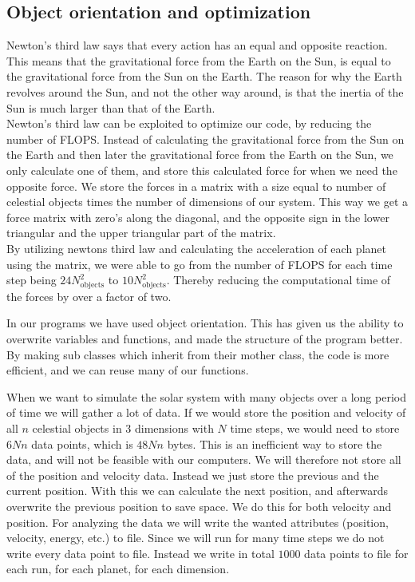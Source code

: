 \documentclass[%
 reprint,
nofootinbib,
aps,
]{revtex4-1}
\begin{document}
\subsection{Object orientation and optimization}
Newton's third law says that every action has an equal and opposite reaction. This means that the gravitational force from the Earth on the Sun, is equal to the gravitational force from the Sun on the Earth. The reason for why the Earth revolves around the Sun, and not the other way around, is that the inertia of the Sun is much larger than that of the Earth.\\
Newton's third law can be exploited to optimize our code, by reducing the number of FLOPS. Instead of calculating the gravitational force from the Sun on the Earth and then later the gravitational force from the Earth on the Sun, we only calculate one of them, and store this calculated force for when we need the opposite force.
We store the forces in a matrix with a size equal to number of celestial objects times the number of dimensions of our system. This way we get a force matrix with zero's along the diagonal, and the opposite sign in the lower triangular and the upper triangular part of the matrix.\\
By utilizing newtons third law and calculating the acceleration of each planet using the matrix, we were able to go from the number of FLOPS for each time step being $24N_{\text{objects}}^2$ to $10N_{\text{objects}}^2$. Thereby reducing the computational time of the forces by over a factor of two. \par
In our programs we have used object orientation. This has given us the ability to overwrite variables and functions, and made the structure of the program better. By making sub classes which inherit from their mother class, the code is more efficient, and we can reuse many of our functions.\par
When we want to simulate the solar system with many objects over a long period of time we will gather a lot of data. If we would store the position and velocity of all $n$ celestial objects in $3$ dimensions with $N$ time steps, we would need to store $6Nn$ data points, which is $48Nn$ bytes. This is an inefficient way to store the data, and will not be feasible with our computers. We will therefore not store all of the position and velocity data. Instead we just store the previous and the current position. With this we can calculate the next position, and afterwards overwrite the previous position to save space. We do this for both velocity and position. For analyzing the data we will write the wanted attributes (position, velocity, energy, etc.) to file. Since we will run for many time steps we do not write every data point to file. Instead we write in total $1000$ data points to file for each run, for each planet, for each dimension.
\end{document}
